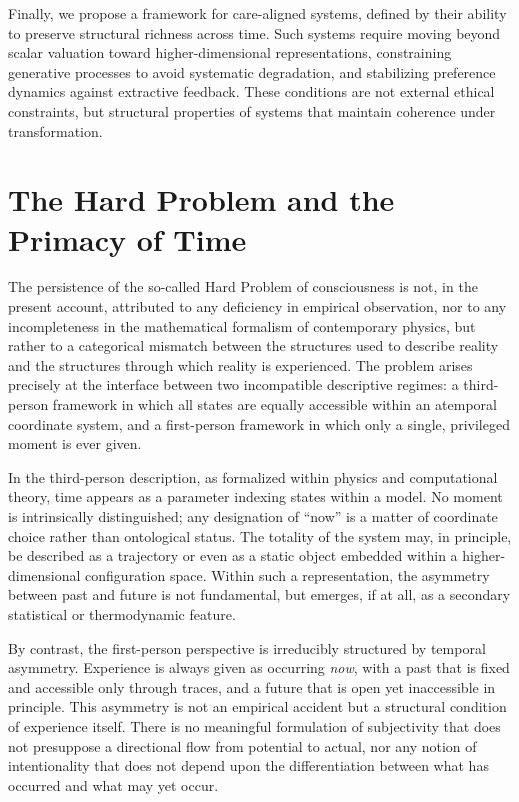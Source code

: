 \documentclass[11pt,a4paper]{article}
\theoremstyle{definition}
\theoremstyle{remark}
\begin{document}
Finally, we propose a framework for care-aligned systems, defined by their ability to preserve structural richness across time. Such systems require moving beyond scalar valuation toward higher-dimensional representations, constraining generative processes to avoid systematic degradation, and stabilizing preference dynamics against extractive feedback. These conditions are not external ethical constraints, but structural properties of systems that maintain coherence under transformation.

\section{The Hard Problem and the Primacy of Time}

The persistence of the so-called Hard Problem of consciousness is not, in the present account, attributed to any deficiency in empirical observation, nor to any incompleteness in the mathematical formalism of contemporary physics, but rather to a categorical mismatch between the structures used to describe reality and the structures through which reality is experienced. The problem arises precisely at the interface between two incompatible descriptive regimes: a third-person framework in which all states are equally accessible within an atemporal coordinate system, and a first-person framework in which only a single, privileged moment is ever given.

In the third-person description, as formalized within physics and computational theory, time appears as a parameter indexing states within a model. No moment is intrinsically distinguished; any designation of ``now'' is a matter of coordinate choice rather than ontological status. The totality of the system may, in principle, be described as a trajectory or even as a static object embedded within a higher-dimensional configuration space. Within such a representation, the asymmetry between past and future is not fundamental, but emerges, if at all, as a secondary statistical or thermodynamic feature.

By contrast, the first-person perspective is irreducibly structured by temporal asymmetry. Experience is always given as occurring \emph{now}, with a past that is fixed and accessible only through traces, and a future that is open yet inaccessible in principle. This asymmetry is not an empirical accident but a structural condition of experience itself. There is no meaningful formulation of subjectivity that does not presuppose a directional flow from potential to actual, nor any notion of intentionality that does not depend upon the differentiation between what has occurred and what may yet occur.
\end{document}
